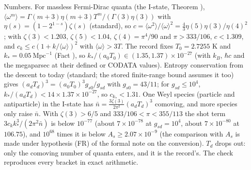 Numbers. For massless Fermi-Dirac quanta (the I-state, Theorem ), $\langle\omega^{m}\rangle = \Gamma(m + 3)\eta(m + 3)T^{m}/(\Gamma(3)\eta(3))$ with $\eta(s) = (1 - 2^{1 - s})\zeta(s)$ (standard), so $c = \langle\omega^{2}\rangle/\langle\omega\rangle^{2} = \tfrac43\eta(5)\eta(3)/\eta(4)^{2}$; with $\zeta(3) < 1.203$, $\zeta(5) < 1.04$, $\zeta(4) = \pi^{4}/90$ and $\pi > 333/106$, $c < 1.309$, and $c_{k} \le c(1 + k/\langle\omega\rangle)^{2}$ with $\langle\omega\rangle > 3T$. The record fixes $T_{0} = 2.7255$ K and $k_{*} = 0.05\ \mathrm{Mpc}^{-1}$ (Fact ), so $k_{*}/(a_{0}T_{0}) \in (1.35, 1.37) \times 10^{-27}$ (with $k_{B}$, $\hbar c$ and the megaparsec at their defined or CODATA values). Entropy conservation from the descent to today (standard; the stored finite-range bound assumes it too) gives $(a_{d}T_{d})^{3} = (a_{0}T_{0})^{3}g_{s0}/g_{sd}$ with $g_{s0} = 43/11$; for $g_{sd} \le 10^{4}$, $k_{*}/(a_{d}T_{d}) < 14 \times 1.37 \times 10^{-27}$, so $c_{k_{*}} < 1.31$. One Weyl species (particle and antiparticle) in the I-state has $\bar n = \tfrac{3\zeta(3)}{2\pi^{2}}(a_{d}T_{d})^{3}$ comoving, and more species only raise $\bar n$. With $\zeta(3) > 6/5$ and $333/106 < \pi < 355/113$ the shot term $3c_{k}k_{*}^{3}/(2\pi^{2}\bar n)$ is below $10^{-77}$ (about $7 \times 10^{-78}$ at $g_{sd} = 10^{4}$, about $7 \times 10^{-80}$ at $106.75$), and $10^{68}$ times it is below $A_{s} \ge 2.07 \times 10^{-9}$ (the comparison with $A_{s}$ is made under hypothesis (FR) of the formal note on the conversion). $T_{d}$ drops out: only the comoving number of quanta enters, and it is the record's. The check reproduces every bracket in exact arithmetic.


